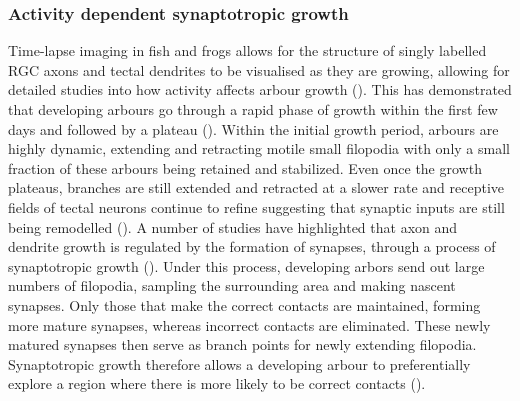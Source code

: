 \subsubsection{Activity dependent synaptotropic growth}
Time-lapse imaging in fish and frogs allows for the structure of singly labelled RGC axons and tectal dendrites to be visualised as they are growing, allowing for detailed studies into how activity affects arbour growth (\cite{ORourke1990DynamicStudy, Kaethner1992DynamicsAxons}). This has demonstrated that developing arbours go through a rapid phase of growth within the first few days and followed by a plateau (\cite{Wu1999DendriticMaturation, Cline2001DendriticSynaptogenesis, Meyer2006EvidenceMechanisms, Niell2004InArbor}). Within the initial growth period, arbours are highly dynamic, extending and retracting motile small filopodia with only a small fraction of these arbours being retained and stabilized. Even once the growth plateaus, branches are still extended and retracted at a slower rate and receptive fields of tectal neurons continue to refine suggesting that synaptic inputs are still being remodelled (\cite{Zhang2011FunctionalZebrafish}). A number of studies have highlighted that axon and dendrite growth is regulated by the formation of synapses, through a process of synaptotropic growth (\cite{Niell2004InArbor, Ruthazer2006StabilizationMaturation, Meyer2006EvidenceMechanisms}). Under this process, developing arbors send out large numbers of filopodia,  sampling the surrounding area and making nascent synapses. Only those that make the correct contacts are maintained, forming more mature synapses, whereas incorrect contacts are eliminated. These newly matured synapses then serve as branch points for newly extending filopodia.  Synaptotropic  growth therefore allows a developing arbour to preferentially explore a region where there is more likely to be correct contacts (\cite{Cline2001DendriticSynaptogenesis}). 

